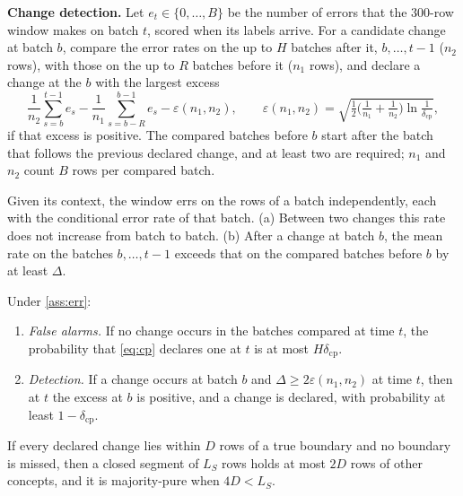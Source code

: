 \textbf{Change detection.} Let $e_t\in\{0,\dots,B\}$ be the number of errors that the $300$-row window makes on
batch $t$, scored when its labels arrive. For a candidate change at batch $b$, compare the error rates on the up to
$H$ batches after it, $b,\dots,t-1$ ($n_2$ rows), with those on the up to $R$ batches before it ($n_1$ rows), and
declare a change at the $b$ with the largest excess
\begin{equation}\label{eq:cp}
  \frac{1}{n_2}\sum_{s=b}^{t-1}e_s-\frac{1}{n_1}\sum_{s=b-R}^{b-1}e_s-\varepsilon(n_1,n_2),\qquad
  \varepsilon(n_1,n_2)=\sqrt{\tfrac12\bigl(\tfrac1{n_1}+\tfrac1{n_2}\bigr)\ln\tfrac1{\delta_{\mathrm{cp}}}},
\end{equation}
if that excess is positive. The compared batches before $b$ start after the batch that follows the previous
declared change, and at least two are required; $n_1$ and $n_2$ count $B$ rows per compared batch.

\begin{assumption}\label{ass:err}
Given its context, the window errs on the rows of a batch independently, each with the conditional error rate of
that batch. (a) Between two changes this rate does not increase from batch to batch. (b) After a change at batch $b$,
the mean rate on the batches $b,\dots,t-1$ exceeds that on the compared batches before $b$ by at least
$\Delta$.
\end{assumption}

\begin{proposition}[Detection]\label{prop:cp}
Under \cref{ass:err}:
\begin{enumerate}
  \item[(i)] \emph{False alarms.} If no change occurs in the batches compared at time $t$, the probability that
  \eqref{eq:cp} declares one at $t$ is at most $H\delta_{\mathrm{cp}}$.
  \item[(ii)] \emph{Detection.} If a change occurs at batch $b$ and $\Delta\ge2\varepsilon(n_1,n_2)$ at time $t$,
  then at $t$ the excess at $b$ is positive, and a change is declared, with probability at least
  $1-\delta_{\mathrm{cp}}$.
\end{enumerate}
\end{proposition}

\begin{corollary}\label{cor:cp}
If every declared change lies within $D$ rows of a true boundary and no boundary is missed, then a closed segment
of $L_S$ rows holds at most $2D$ rows of other concepts, and it is majority-pure when $4D<L_S$.
\end{corollary}

